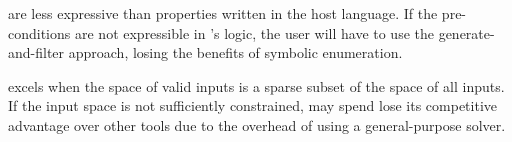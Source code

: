  are less expressive than properties written in the
  host language. If the pre-conditions are not expressible in \toolname's logic,
  the user will have to use the generate-and-filter approach, losing the benefits
  of symbolic enumeration.
  
 \toolname excels when the space of valid inputs is
  a sparse subset of the space of all inputs. If the input space is not
  sufficiently constrained, \toolname may spend lose its competitive advantage
  over other tools due to the overhead of using a general-purpose solver.


